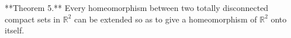 **Theorem 5.** Every homeomorphism between two totally disconnected compact sets in $\mathbb{R}^2$ can be extended so as to give a homeomorphism of $\mathbb{R}^2$ onto itself.

